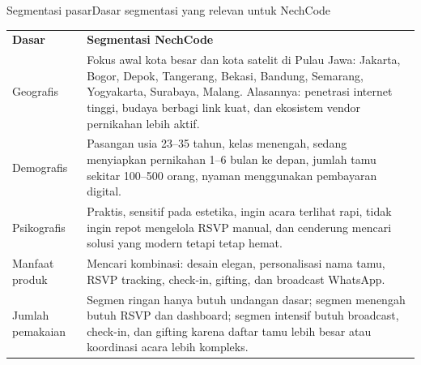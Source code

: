 \documentclass[aspectratio=169,11pt]{beamer}
\begin{document}
\begin{frame}[shrink=8]{Segmentasi pasar}{Dasar segmentasi yang relevan untuk NechCode}
\small
{}
\begin{tabularx}{\textwidth}{>{\raggedright\arraybackslash}p{2.5cm}X}
\rowcolor{Navy!12}
\textbf{Dasar} & \textbf{Segmentasi NechCode} \\
Geografis & Fokus awal kota besar dan kota satelit di Pulau Jawa: Jakarta, Bogor, Depok, Tangerang, Bekasi, Bandung, Semarang, Yogyakarta, Surabaya, Malang. Alasannya: penetrasi internet tinggi, budaya berbagi link kuat, dan ekosistem vendor pernikahan lebih aktif. \\
Demografis & Pasangan usia 23--35 tahun, kelas menengah, sedang menyiapkan pernikahan 1--6 bulan ke depan, jumlah tamu sekitar 100--500 orang, nyaman menggunakan pembayaran digital. \\
Psikografis & Praktis, sensitif pada estetika, ingin acara terlihat rapi, tidak ingin repot mengelola RSVP manual, dan cenderung mencari solusi yang modern tetapi tetap hemat. \\
Manfaat produk & Mencari kombinasi: desain elegan, personalisasi nama tamu, RSVP tracking, check-in, gifting, dan broadcast WhatsApp. \\
Jumlah pemakaian & Segmen ringan hanya butuh undangan dasar; segmen menengah butuh RSVP dan dashboard; segmen intensif butuh broadcast, check-in, dan gifting karena daftar tamu lebih besar atau koordinasi acara lebih kompleks. \\
\end{tabularx}
\end{frame}
\end{document}
